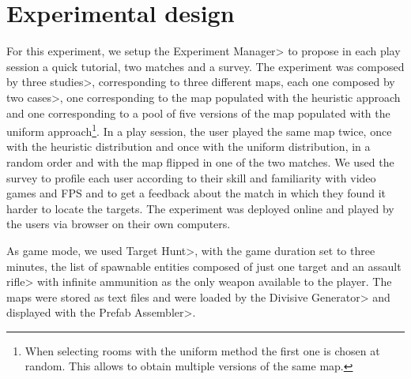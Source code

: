 
\section{Experimental design}

For this experiment, we setup the \<Experiment Manager> to propose in each play session a quick tutorial, two matches and a survey. The experiment was composed by three \<studies>, corresponding to three different maps, each one composed by two \<cases>, one corresponding to the map populated with the heuristic approach and one corresponding to a pool of five versions of the map populated with the uniform approach\footnote{When selecting rooms with the uniform method the first one is chosen at random. This allows to obtain multiple versions of the same map.}. In a play session, the user played the same map twice, once with the heuristic distribution and once with the uniform distribution, in a random order and with the map flipped in one of the two matches. We used the survey to profile each user according to their skill and familiarity with video games and FPS and to get a feedback about the match in which they found it harder to locate the targets. The experiment was deployed online and played by the users via browser on their own computers.

\par

As game mode, we used \<Target Hunt>, with the game duration set to three minutes, the list of spawnable entities composed of just one target and an \<assault rifle> with infinite ammunition as the only weapon available to the player. The maps were stored as text files and were loaded by the \<Divisive Generator> and displayed with the \<Prefab Assembler>. 

\par

